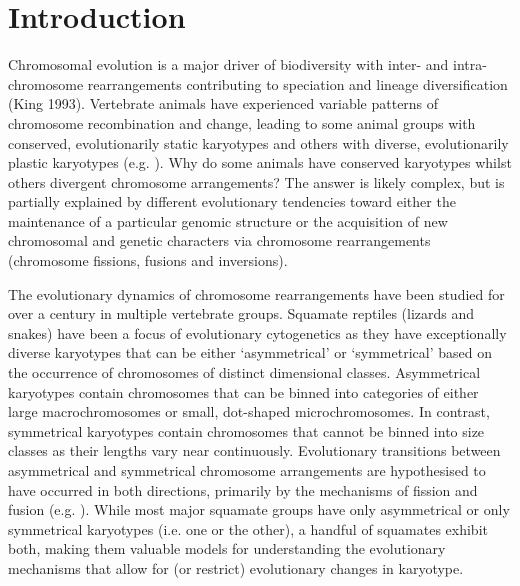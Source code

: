 \documentclass[a4paper, 12pt]{article}
\begin{document}

\section{Introduction}\label{main}

Chromosomal evolution is a major driver of biodiversity with inter- and intra-chromosome rearrangements contributing to speciation and lineage diversification\cite{pellestor2020chromoanagenesis} (King 1993). 
Vertebrate animals have experienced variable patterns of chromosome recombination and change, leading to some animal groups with conserved, evolutionarily static karyotypes and others with diverse, evolutionarily plastic karyotypes (e.g. \cite{graphodatsky2011genome,neto2011extensive,mezzasalma2019changes,degrandi2020distribution,mayrose2021evolution}).
Why do some animals have conserved karyotypes whilst others divergent chromosome arrangements? 
The answer is likely complex, but is partially explained by different evolutionary tendencies toward either the maintenance of a particular genomic structure or the acquisition of new chromosomal and genetic characters via chromosome rearrangements (chromosome fissions, fusions and inversions\cite{crombach2007chromosome,amorim2021new}).

The evolutionary dynamics of chromosome rearrangements have been studied for over a century in multiple vertebrate groups\cite{damas2021vertebrate}. 
Squamate reptiles (lizards and snakes) have been a focus of evolutionary cytogenetics as they have exceptionally diverse karyotypes that can be either ‘asymmetrical’ or ‘symmetrical’ based on the occurrence of chromosomes of distinct dimensional classes\cite{stebbins1950chapter,white1973}. 
Asymmetrical karyotypes contain chromosomes that can be binned into categories of either large macrochromosomes or small, dot-shaped microchromosomes.
In contrast, symmetrical karyotypes contain chromosomes that cannot be binned into size classes as their lengths vary near continuously. 
Evolutionary transitions between asymmetrical and symmetrical chromosome arrangements are hypothesised to have occurred in both directions, primarily by the mechanisms of fission and fusion (e.g. \cite{olmo2008trends,srikulnath2015karyotype}). 
While most major squamate groups have only asymmetrical or only symmetrical karyotypes (i.e. one or the other), a handful of squamates exhibit both\cite{mezzasalma2021lizards}, making them valuable models for understanding the evolutionary mechanisms that allow for (or restrict) evolutionary changes in karyotype.    
\end{document}
